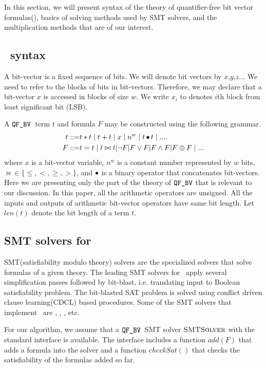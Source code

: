 In this section, we will present syntax of
the theory of quantifier-free bit vector formulas(\qfbv),
basics of solving methods used by SMT solvers,
and the multiplication methods that are of our interest. 

\subsection{\qfbv~syntax}

A bit-vector is a fixed sequence of bits.
%
We will denote bit vectors by $x$,$y$,$z$...
%
We need to refer to the blocks of bits in 
bit-vectors.
Therefore, we may declare that a bit-vector $x$
is accessed in blocks of size $w$.
%
We write $x_i$ to denotes $i$th block from
least significant bit (LSB).


A $\texttt{QF\_BV}$~term $t$ and formula $F$ may be constructed using
the following grammar.
\begin{align*}
t ::= & t * t \mid t + t \mid x \mid n^w \mid t \mathop{\bullet} t \mid ....\\
F ::= & t = t \mid t \bowtie t | \lnot F | F \lor F | F \land F | F \oplus F \mid ... 
\end{align*}
where $x$ is a bit-vector variable, 
$n^w$ is a constant number represented by $w$ bits,
$\bowtie \in \{\leq , <, \geq, > \}$, and
$\mathop{\bullet}$ is a binary operator that concatenates bit-vectors.
%
Here we are presenting only the  part of the theory
of $\texttt{QF\_BV}$ that is relevant to our discussion.
%
In this paper, all the arithmetic operators are unsigned.
%
All the inputs and outputs of arithmetic bit-vector operators 
have same bit length.
%
Let $len(t)$ denote the bit length of a term $t$.

\subsection{SMT solvers for \qfbv}

SMT(satisfiability modulo theory)
solvers are the specialized solvers that solve 
formulas of a given theory.
%
The leading SMT solvers for \qfbv~apply several simplification
passes followed by bit-blast, i.e. translating input to Boolean
satisfiability problem.
%
The bit-blasted SAT problem is solved using conflict driven clause
learning(CDCL) based procedures.
%
Some of the SMT solvers that implement \qfbv~are
\zthree, \boolector, \cvcfour, etc.

For our algorithm, we assume that a  $\texttt{QF\_BV}$~SMT
solver $\textsc{SMTSolver}$ 
with the standard interface is available.
%
The interface includes a function $add(F)$ that adds a formula
into the solver and a function $checkSat()$ that checks the
satisfiability of the formulas added so far. 

